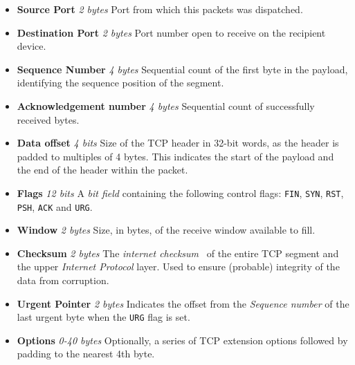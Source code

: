 \documentclass[11pt,a4paper,british]{bhamarticle}
\begin{document}
\begin{multicols}{2}
\begin{itemize}
    \item \textbf{Source Port} \textit{2 bytes} Port from which this packets was dispatched.
    \item \textbf{Destination Port} \textit{2 bytes} Port number open to receive on the recipient device.
    \item \textbf{Sequence Number} \textit{4 bytes} Sequential count of the first byte in the payload, identifying the sequence position of the segment.
    \item \textbf{Acknowledgement number} \textit{4 bytes} Sequential count of successfully received bytes.
    \item \textbf{Data offset} \textit{4 bits} Size of the TCP header in 32-bit words, as the header is padded to multiples of 4 bytes. This indicates the start of the payload and the end of the header within the packet.
    \item \textbf{Flags} \textit{12 bits} A \textit{bit field} containing the following control flags: \texttt{FIN}, \texttt{SYN}, \texttt{RST}, \texttt{PSH}, \texttt{ACK} and \texttt{URG}.
    \item \textbf{Window} \textit{2 bytes} Size, in bytes, of the receive window available to fill.
    \item \textbf{Checksum} \textit{2 bytes} The \textit{internet checksum}~\cite{internetchecksum} of the entire TCP segment and the upper \textit{Internet Protocol} layer. Used to ensure (probable) integrity of the data from corruption.
    \item \textbf{Urgent Pointer} \textit{2 bytes} Indicates the offset from the \textit{Sequence number} of the last urgent byte when the \texttt{URG} flag is set.
    \item \textbf{Options} \textit{0-40 bytes} Optionally, a series of TCP extension options followed by padding to the nearest 4th byte.%
\end{itemize}


\end{multicols}
\end{document}
